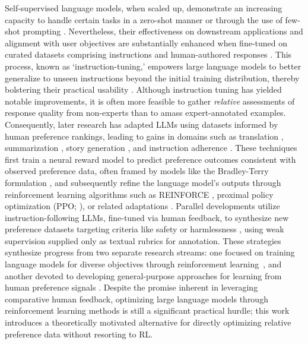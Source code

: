 Self-supervised language models, when scaled up, demonstrate an increasing capacity to handle certain tasks in a zero-shot manner \citep{radford2019language} or through the use of few-shot prompting \citep{gpt3,megatron,chowdhery2022palm}. Nevertheless, their effectiveness on downstream applications and alignment with user objectives are substantially enhanced when fine-tuned on curated datasets comprising instructions and human-authored responses \citep{mishra-etal-2022-cross,sanh2022multitask,chung2022scaling,thoppilan2022lamda}. This process, known as `instruction-tuning,' empowers large language models to better generalize to unseen instructions beyond the initial training distribution, thereby bolstering their practical usability \citep{chung2022scaling}. Although instruction tuning has yielded notable improvements, it is often more feasible to gather \textit{relative} assessments of response quality from non-experts than to amass expert-annotated examples. Consequently, later research has adapted LLMs using datasets informed by human preference rankings, leading to gains in domains such as translation \citep{kreutzer-etal-2018-reliability}, summarization \citep{stiennon2022learning,ziegler2020finetuning}, story generation \citep{ziegler2020finetuning}, and instruction adherence \citep{ouyang2022training,ramamurthy2023is}. These techniques first train a neural reward model to predict preference outcomes consistent with observed preference data, often framed by models like the Bradley-Terry formulation \citep{bradley1952rankanalysis}, and subsequently refine the language model’s outputs through reinforcement learning algorithms such as REINFORCE \citep{williams1992reinforce}, proximal policy optimization (PPO; \cite{schulman2017proximal}), or related adaptations \citep{ramamurthy2023is}. Parallel developments utilize instruction-following LLMs, fine-tuned via human feedback, to synthesize new preference datasets targeting criteria like safety or harmlessness \citep{bai2022constitutional}, using weak supervision supplied only as textual rubrics for annotation. These strategies synthesize progress from two separate research streams: one focused on training language models for diverse objectives through reinforcement learning~\citep{Ranzato2015SequenceLT,paulus2018a,wu2018learning}, and another devoted to developing general-purpose approaches for learning from human preference signals \citep{christiano2017deep,kupcsik2018learning}. Despite the promise inherent in leveraging comparative human feedback, optimizing large language models through reinforcement learning methods is still a significant practical hurdle; this work introduces a theoretically motivated alternative for directly optimizing relative preference data without resorting to RL.

